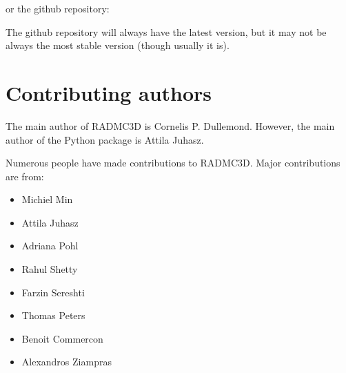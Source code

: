 \documentclass[letterpaper,10pt,english]{sphinxmanual}
\begin{document}


or the github repository:


The github repository will always have the latest version, but it may
not be always the most stable version (though usually it is).


\section{Contributing authors}
\label{\detokenize{introduction:contributing-authors}}
The main author of RADMC\sphinxhyphen{}3D is Cornelis P. Dullemond. However, the main
author of the  Python package is Attila Juhasz.

Numerous people have made contributions to RADMC\sphinxhyphen{}3D. Major contributions
are from:
\begin{itemize}
\item {} 
Michiel Min

\item {} 
Attila Juhasz

\item {} 
Adriana Pohl

\item {} 
Rahul Shetty

\item {} 
Farzin Sereshti

\item {} 
Thomas Peters

\item {} 
Benoit Commercon

\item {} 
Alexandros Ziampras

\end{itemize}
\end{document}
